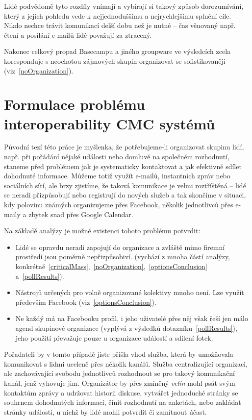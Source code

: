 \documentclass[12pt,oneside,final]{fithesis2}
\begin{document}
Lidé podvědomě tyto rozdíly vnímají a vybírají si takový způsob dorozumívání, který z jejich pohledu vede k nejjednoduššímu a nejrychlejšímu splnění cíle. Nikdo nechce trávit komunikací delší dobu než je nutné -- čas věnovaný např. čtení a posílání e-mailů lidé považují za ztracený.

Nakonec celkový propad Basecampu a jiného groupware ve výsledcích zcela koresponduje s neochotou zájmových skupin organizovat se sofistikovaněji (viz~\ref{noOrganization}).



\chapter{Formulace problému interoperability CMC systémů}\label{interoperabilityProblem}
Původní tezí této práce je myšlenka, že potřebujeme-li organizovat skupinu lidí, např. při pořádání nějaké události nebo domluvě na společném rozhodnutí, staneme před problémem jak je systematicky kontaktovat a jak efektivně sdílet dohodnuté informace. Můžeme totiž využít e-mailů, instantních zpráv nebo sociálních sítí, ale brzy zjistíme, že taková komunikace je velmi roztříštěná -- lidé se neradi přizpůsobují nebo registrují do nových služeb a tak skončíme v situaci, kdy polovinu známých organizujeme přes Facebook, několik jednotlivců přes e-maily a zbytek snad přes Google Calendar.

Na základě analýzy je možné existenci tohoto problému potvrdit:

\begin{itemize}
    \item Lidé se opravdu neradi zapojují do organizace a zvláště mimo firemní prostředí jsou poměrně nepřizpůsobiví. (vychází z mnoha částí analýzy, konkrétně~\ref{criticalMass},~\ref{noOrganization},~\ref{optionsConclusion} a~\ref{pollResults}).
    \item Nástrojů určených pro volně organizované kolektivy mnoho není. Lze využít především Facebook (viz~\ref{optionsConclusion}).
    \item Ne každý má na Facebooku profil, i jeho uživatelé přes něj však řeší jen málo agend skupinové organizace (vyplývá z výsledků dotazníku~\ref{pollResults}), jeho použití převažuje pouze u organizace událostí a sdílení fotek.
\end{itemize}

Pořadateli by v tomto případě jiste přišla vhod služba, která by u\-mož\-ňo\-va\-la komunikovat s lidmi uceleně přes několik kanálů. Služba centralizující organizaci, ale zachovávající svobodu jednotlivců rozhodnout se pro takový komunikační kanál, jenž vyhovuje jim. Organizátor by přes zmíněný \emph{velín} mohl psát svým kontaktům zprávy a udržovat historii diskuse, vytvářet jednoduché stránky se souhrnem dohodnutých informací, činit rozhodnutí na anketách, nebo zakládat stránky událostí, u nichž by lidé mohli potvrdit či zamítnout účast.
\end{document}
